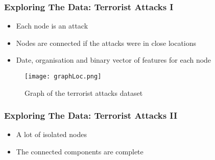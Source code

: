 \begin{frame}
\frametitle{Exploring The Data: Terrorist Attacks I}
	
	\begin{itemize}
		\item Each node is an attack
		\item Nodes are connected if the attacks were in close locations
		\item Date, organisation and binary vector of features for each node
	\end{itemize}
	
	\begin{figure}
		\begin{center}
			\texttt{[image: graphLoc.png]}
			\caption{Graph of the terrorist attacks dataset}
			\label{fig:graph attacks}
		\end{center}
	\end{figure}
\end{frame}

\begin{frame}
\frametitle{Exploring The Data: Terrorist Attacks II}
	
	\begin{center}
	\end{center}
	
	\begin{itemize}
		\item A lot of isolated nodes
		\item The  connected components are complete
	\end{itemize}
\end{frame}
